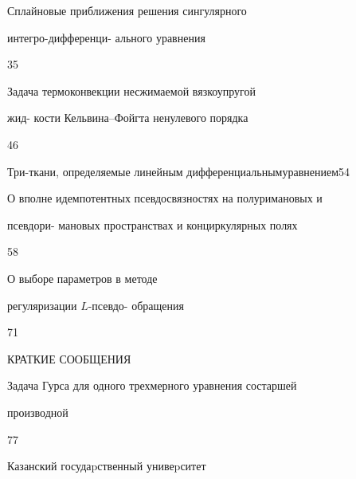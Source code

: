 {Сплайновые приближения решения сингулярного 


интегро-дифференци- \newline ального уравнения}{35}




{Задача термоконвекции несжимаемой вязкоупругой


жид- \newline кости Кельвина--Фойгта ненулевого порядка}{46}




{Три-ткани, определяемые линейным дифференциальным\newline уравнением}{54}




{О вполне идемпотентных псевдосвязностях на полуримановых и


псевдори- \newline мановых пространствах и конциркулярных полях}{58}




{О выборе параметров в методе


регуляризации $L$-псевдо- \newline обращения}{71}





\bigskip


\par


\centerline{\Large КРАТКИЕ СООБЩЕНИЯ}


\bigskip







{Задача Гурса для одного трехмерного уравнения со\newline старшей 


производной}{77}








\vfill


\noindent\raisebox{2pt}{\copyright} Казанский госудаpственный унивеpситет





